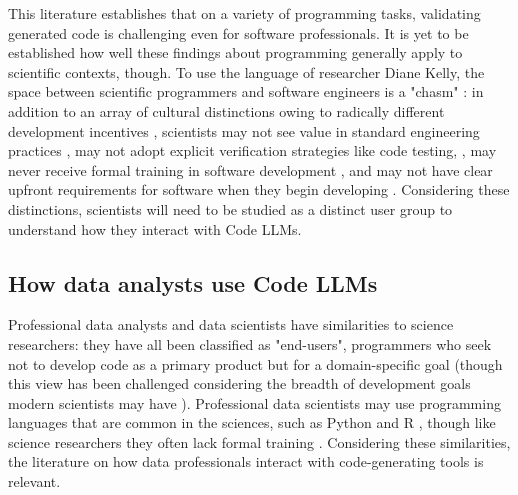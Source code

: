 This literature establishes that on a variety of programming tasks, validating generated code is challenging even for software professionals. It is yet to be established how well these findings about programming generally apply to scientific contexts, though. To use the language of researcher Diane Kelly, the space between scientific programmers and software engineers is a "chasm" \cite{Kelly2007AComputing}: in addition to an array of cultural distinctions owing to radically different development incentives \cite{Hannay2009HowSoftware, Storer2017BridgingProgramming}, scientists may not see value in standard engineering practices \cite{Carver2013Self-perceptionsEngineers}, may not adopt explicit verification strategies like code testing, \cite{Kanewala2014TestingReview, Heaton2015ClaimsReview}, may never receive formal training in software development \cite{Carver2022AStates,Hettrick2014ItsResearchers}, and may not have clear upfront requirements for software when they begin developing \cite{Segal2009SomeScientists, Smith2019DebunkingSoftware}. Considering these distinctions, scientists will need to be studied as a distinct user group to understand how they interact with Code LLMs.  


\subsection{How data analysts use Code LLMs}
Professional data analysts and data scientists have similarities to science researchers: they have all been classified as "end-users", programmers who seek not to develop code as a primary product but for a domain-specific goal \cite{Segal2007SomeDevelopers,Rothermel2011TheEngineering} (though this view has been challenged considering the breadth of development goals modern scientists may have \cite{Kelly2015ScientificSoftware}). Professional data scientists may use programming languages that are common in the sciences, such as Python and R \cite{Albright2018ACS1}, though like science researchers they often lack formal training \cite{Kross2019PractitionersAcademia, Kandel2012EnterpriseStudy}. Considering these similarities, the literature on how data professionals interact with code-generating tools is relevant. 


